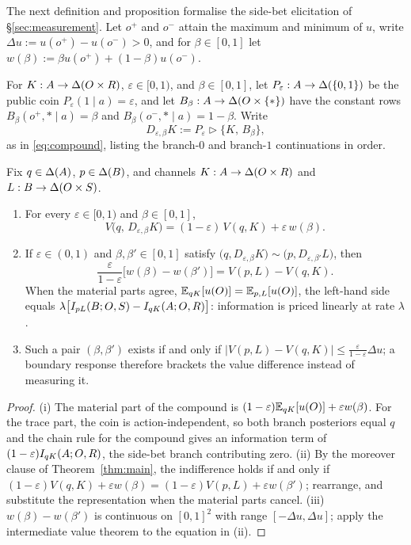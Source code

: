 The next definition and proposition formalise the side-bet elicitation of \S\ref{sec:measurement}.  Let $o^+$
and $o^-$ attain the maximum and minimum of $u$, write $\Delta u:=u(o^+)-u(o^-)>0$, and for $\beta\in[0,1]$ let
$w(\beta):=\beta u(o^+)+(1-\beta)u(o^-)$.

\begin{definition}\label{def:dilution}
For $K:A\to\Delta(O\times R)$, $\varepsilon\in[0,1)$, and $\beta\in[0,1]$, let $P_\varepsilon:A\to\Delta(\{0,1\})$ be the
public coin $P_\varepsilon(1\mid a)=\varepsilon$, and let $B_\beta:A\to\Delta(O\times\{\ast\})$ have the constant rows
$B_\beta(o^+,\ast\mid a)=\beta$ and $B_\beta(o^-,\ast\mid a)=1-\beta$.  Write
\[
 D_{\varepsilon,\beta}K:=P_\varepsilon\triangleright\{K,\,B_\beta\},
\]
as in \eqref{eq:compound}, listing the branch-$0$ and branch-$1$ continuations in order.
\end{definition}

\begin{proposition}\label{prop:wtp}
Fix $q\in\Delta(A)$, $p\in\Delta(B)$, and channels $K:A\to\Delta(O\times R)$ and $L:B\to\Delta(O\times S)$.
\begin{enumerate}[label=\textup{(\roman*)},leftmargin=*]
\item For every $\varepsilon\in[0,1)$ and $\beta\in[0,1]$,
\[
 V\bigl(q,\,D_{\varepsilon,\beta}K\bigr)=(1-\varepsilon)\,V(q,K)+\varepsilon\,w(\beta).
\]
\item If $\varepsilon\in(0,1)$ and $\beta,\beta'\in[0,1]$ satisfy
$\bigl(q,D_{\varepsilon,\beta}K\bigr)\sim\bigl(p,D_{\varepsilon,\beta'}L\bigr)$, then
\[
 \frac{\varepsilon}{1-\varepsilon}\bigl[w(\beta)-w(\beta')\bigr]
 =V(p,L)-V(q,K).
\]
When the material parts agree, $\mathbb E_{qK}[u(O)]=\mathbb E_{p,L}[u(O)]$, the left-hand side equals
$\lambda\bigl[I_{pL}(B;O,S)-I_{qK}(A;O,R)\bigr]$: information is priced linearly at rate $\lambda$.
\item Such a pair $(\beta,\beta')$ exists if and only if
$\lvert V(p,L)-V(q,K)\rvert\le\frac{\varepsilon}{1-\varepsilon}\Delta u$; a boundary response therefore brackets
the value difference instead of measuring it.
\end{enumerate}
\end{proposition}

\begin{proof}
(i) The material part of the compound is $(1-\varepsilon)\mathbb E_{qK}[u(O)]+\varepsilon w(\beta)$.  For the trace part,
the coin is action-independent, so both branch posteriors equal $q$ and the chain rule for the compound gives an
information term of $(1-\varepsilon)I_{qK}(A;O,R)$, the side-bet branch contributing zero.
(ii) By the moreover clause of Theorem~\ref{thm:main}, the indifference holds if and only if
$(1-\varepsilon)V(q,K)+\varepsilon w(\beta)=(1-\varepsilon)V(p,L)+\varepsilon w(\beta')$; rearrange, and
substitute the representation when the material parts cancel.
(iii) $w(\beta)-w(\beta')$ is continuous on $[0,1]^2$ with range $[-\Delta u,\Delta u]$; apply the intermediate
value theorem to the equation in \textup{(ii)}.
\end{proof}

